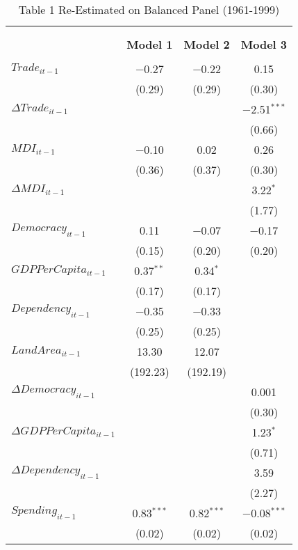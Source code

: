 
\begin{table}[!htbp] \centering 
  \caption{Table 1 Re-Estimated on Balanced Panel (1961-1999)} 
  \label{} 
\footnotesize 
\begin{tabular}{@{\extracolsep{5pt}}lccc} 
\\[-1.8ex]\hline \\[-1.8ex] 
\\[-1.8ex] & \textbf{Model 1} & \textbf{Model 2} & \textbf{Model 3}\\ 
\hline \\[-1.8ex] 
 $Trade_{it-1}$ & $-$0.27 & $-$0.22 & 0.15 \\ 
  & (0.29) & (0.29) & (0.30) \\ 
  $\Delta Trade_{it-1}$ &  &  & $-$2.51$^{***}$ \\ 
  &  &  & (0.66) \\ 
  $MDI_{it-1}$ & $-$0.10 & 0.02 & 0.26 \\ 
  & (0.36) & (0.37) & (0.30) \\ 
  $\Delta MDI_{it-1}$ &  &  & 3.22$^{*}$ \\ 
  &  &  & (1.77) \\ 
  $Democracy_{it-1}$ & 0.11 & $-$0.07 & $-$0.17 \\ 
  & (0.15) & (0.20) & (0.20) \\ 
  $GDPPerCapita_{it-1}$ & 0.37$^{**}$ & 0.34$^{*}$ &  \\ 
  & (0.17) & (0.17) &  \\ 
  $Dependency_{it-1}$ & $-$0.35 & $-$0.33 &  \\ 
  & (0.25) & (0.25) &  \\ 
  $LandArea_{it-1}$ & 13.30 & 12.07 &  \\ 
  & (192.23) & (192.19) &  \\ 
  $\Delta Democracy_{it-1}$ &  &  & 0.001 \\ 
  &  &  & (0.30) \\ 
  $\Delta GDPPerCapita_{it-1}$ &  &  & 1.23$^{*}$ \\ 
  &  &  & (0.71) \\ 
  $\Delta Dependency_{it-1}$ &  &  & 3.59 \\ 
  &  &  & (2.27) \\ 
  $Spending_{it-1}$ & 0.83$^{***}$ & 0.82$^{***}$ & $-$0.08$^{***}$ \\ 
  & (0.02) & (0.02) & (0.02) \\ 

\end{tabular}
\end{table}
